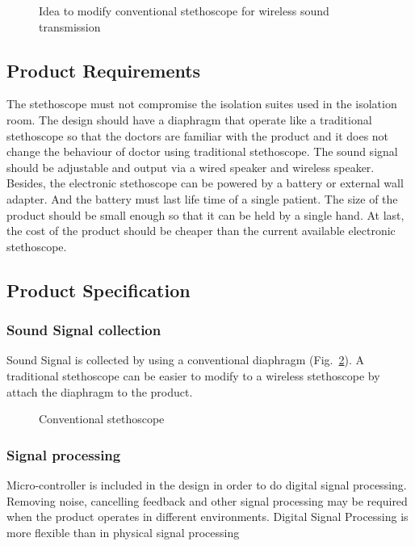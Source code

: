 \begin{figure}[!htbp]
	\centering
	\caption{Idea to modify conventional stethoscope for wireless sound transmission}
	\label{fig:design_idea}
\end{figure}

\subsection{Product Requirements}
The stethoscope must not compromise the isolation suites used in the isolation room. The design should have a diaphragm that operate like a traditional stethoscope so that the doctors are familiar with the product and it does not change the behaviour of doctor using traditional stethoscope. The sound signal should be adjustable and output via a wired speaker and wireless speaker.  Besides, the electronic stethoscope can be powered by a battery or external wall adapter. And the battery must last life time of a single patient. The size of the product should be small enough so that it can be held by a single hand. At last, the cost of the product should be cheaper than the current available electronic stethoscope.

\subsection{Product Specification}
\subsubsection{Sound Signal collection}
Sound Signal is collected by using a conventional diaphragm (Fig.~\ref{fig:conventional_stethoscope}). A traditional stethoscope can be easier to modify to a wireless stethoscope by attach the diaphragm to the product.
\begin{figure}[!htbp]
	\centering
	\caption{Conventional stethoscope}
	\label{fig:conventional_stethoscope}
\end{figure}

\subsubsection{Signal processing}
Micro-controller is included in the design in order to do digital signal processing. Removing noise, cancelling feedback and other signal processing may be required when the product operates in different environments. Digital Signal Processing is more flexible than in physical signal processing

